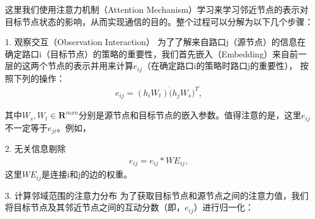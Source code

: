 这里我们使用注意力机制（Attention Mechanism）学习来学习邻近节点的表示对目标节点状态的影响，从而实现通信的目的。整个过程可以分解为以下几个步骤：

1. 观察交互（Observation Interaction）
为了了解来自路口j（源节点）的信息在确定路口i（目标节点）的策略的重要性，我们首先嵌入（Embedding）来自前一层的这两个节点的表示并用来计算$e_{ij}$（在确定路口i的策略时路口j的重要性），
按照下列的操作：
\begin{align}
\label{eq:eij}
  e_{ij}=(h_i W_t) \dot (h_j W_s)^{T},
\end{align}

其中$W_s, W_t \in \mathbf{R}^{mxn}$分别是源节点和目标节点的嵌入参数。值得注意的是，这里$e_{ij}$不一定等于$e_{ji}$。例如，

2. 无关信息剔除
\begin{align}
  \label{eq:mul_phase}
  e_{ij} = e_{ij} * WE_{ij},
\end{align}
这里$WE_{ij}$是连接i和j的边的权重。

3. 计算邻域范围的注意力分布
为了获取目标节点和源节点之间的注意力值，我们将目标节点及其邻近节点之间的互动分数（即，$e_{ij}$）进行归一化：

